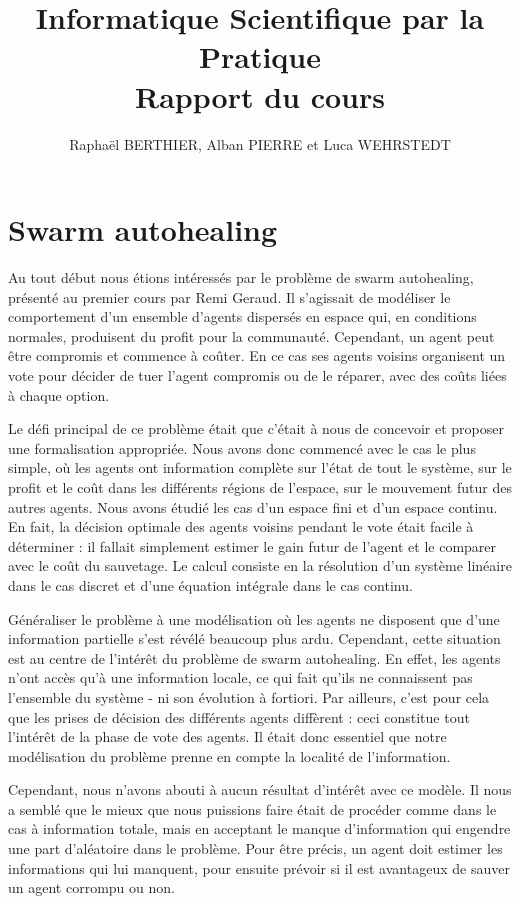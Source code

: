 \documentclass[a4paper,10pt]{article}
\title{Informatique Scientifique par la Pratique\\Rapport du cours}
\author{Raphaël BERTHIER, Alban PIERRE et Luca WEHRSTEDT}
\begin{document}
\maketitle

\section{Swarm autohealing}

Au tout début nous étions intéressés par le problème de swarm autohealing, présenté au premier cours par Remi Geraud. Il s'agissait de modéliser le comportement d'un ensemble d'agents dispersés en espace qui, en conditions normales, produisent du profit pour la communauté. Cependant, un agent peut être compromis et commence à coûter. En ce cas ses agents voisins organisent un vote pour décider de tuer l'agent compromis ou de le réparer, avec des coûts liées à chaque option.

Le défi principal de ce problème était que c’était à nous de concevoir et proposer une formalisation appropriée. Nous avons donc commencé avec le cas le plus simple, où les agents ont information complète sur l’état de tout le système, sur le profit et le coût dans les différents régions de l'espace, sur le mouvement futur des autres agents. Nous avons étudié les cas d'un espace fini et d'un espace continu. En fait, la décision optimale des agents voisins pendant le vote était facile à déterminer : il fallait simplement estimer le gain futur de l'agent et le comparer avec le coût du sauvetage. Le calcul consiste en la résolution d'un système linéaire dans le cas discret et d'une équation intégrale dans le cas continu.

Généraliser le problème à une modélisation où les agents ne disposent que d'une information partielle s'est révélé beaucoup plus ardu. Cependant, cette situation est au centre de l'intérêt du problème de swarm autohealing. En effet, les agents n'ont accès qu'à une information locale, ce qui fait qu'ils ne connaissent pas l'ensemble du système - ni son évolution à fortiori. Par ailleurs, c'est pour cela que les prises de décision des différents agents diffèrent : ceci constitue tout l'intérêt de la phase de vote des agents. Il était donc essentiel que notre modélisation du problème prenne en compte la localité de l'information.

Cependant, nous n'avons abouti à aucun résultat d'intérêt avec ce modèle. Il nous a semblé que le mieux que nous puissions faire était de procéder comme dans le cas à information totale, mais en acceptant le manque d'information qui engendre une part d'aléatoire dans le problème. Pour être précis, un agent doit estimer les informations qui lui manquent, pour ensuite prévoir si il est avantageux de sauver un agent corrompu ou non.
\end{document}
